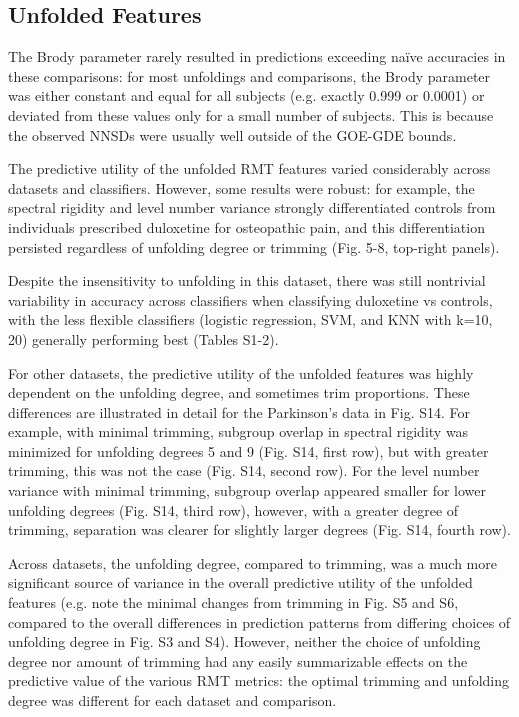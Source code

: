 \documentclass[NETN,manuscript]{stjour-new}
\begin{document}
\subsection{Unfolded Features}
The Brody parameter rarely resulted in predictions exceeding naïve accuracies in these comparisons:
for most unfoldings and comparisons, the Brody parameter was either constant and equal for all
subjects (e.g. exactly 0.999 or 0.0001) or deviated from these values only for a small number of
subjects. This is because the observed NNSDs were usually well outside of the GOE-GDE bounds.

The predictive utility of the unfolded RMT features varied considerably across datasets and
classifiers. However, some results were robust: for example, the spectral rigidity and level number
variance strongly differentiated controls from individuals prescribed duloxetine for osteopathic
pain, and this differentiation persisted regardless of unfolding degree or trimming (Fig. 5-8, top-right panels).

Despite the insensitivity to unfolding in this dataset, there was still nontrivial variability in
accuracy across classifiers when classifying duloxetine vs controls, with the less flexible
classifiers (logistic regression, SVM, and KNN with k=10, 20) generally performing best (Tables
S1-2).

For other datasets, the predictive utility of the unfolded features was highly dependent on the
unfolding degree, and sometimes trim proportions. These differences are illustrated in detail for
the Parkinson's data in Fig. S14. For example, with minimal trimming, subgroup overlap in spectral
rigidity was minimized for unfolding degrees 5 and 9 (Fig. S14, first row), but with greater
trimming, this was not the case (Fig. S14, second row). For the level number variance with minimal
trimming, subgroup overlap appeared smaller for lower unfolding degrees (Fig. S14, third row),
however, with a greater degree of trimming, separation was clearer for slightly larger degrees (Fig.
S14, fourth row).

Across datasets, the unfolding degree, compared to trimming, was a much more significant source of
variance in the overall predictive utility of the unfolded features (e.g. note the minimal changes
from trimming in Fig. S5 and S6, compared to the overall differences in prediction patterns from
differing choices of unfolding degree in Fig. S3 and S4). However, neither the choice of unfolding
degree nor amount of trimming had any easily summarizable effects on the predictive value of the
various RMT metrics: the optimal trimming and unfolding degree was different for each dataset and
comparison.
\end{document}
